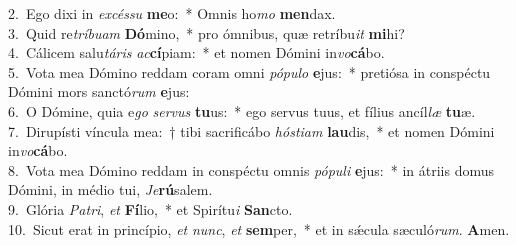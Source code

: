 {2.~}Ego dixi in \textit{ex}\textit{cés}\textit{su} \textbf{me}o:~* Omnis ho\textit{mo} \textbf{men}dax.\\
{3.~}Quid re\textit{trí}\textit{bu}\textit{am} \textbf{Dó}mino,~* pro ómnibus, quæ retríbu\textit{it} \textbf{mi}hi?\\
{4.~}Cálicem salu\textit{tá}\textit{ris} \textit{ac}\textbf{cí}piam:~* et nomen Dómini in\textit{vo}\textbf{cá}bo.\\
{5.~}Vota mea Dómino reddam coram omni \textit{pó}\textit{pu}\textit{lo} \textbf{e}jus:~* pretiósa in conspéctu Dómini mors sanctó\textit{rum} \textbf{e}jus:\\
{6.~}O Dómine, quia e\textit{go} \textit{ser}\textit{vus} \textbf{tu}us:~* ego servus tuus, et fílius ancíl\textit{læ} \textbf{tu}æ.\\
{7.~}Dirupísti víncula mea:~† tibi sacrificábo \textit{hó}\textit{sti}\textit{am} \textbf{lau}dis,~* et nomen Dómini in\textit{vo}\textbf{cá}bo.\\
{8.~}Vota mea Dómino reddam in conspéctu omnis \textit{pó}\textit{pu}\textit{li} \textbf{e}jus:~* in átriis domus Dómini, in médio tui, \textit{Je}\textbf{rú}salem.\\
{9.~}Glória \textit{Pa}\textit{tri}, \textit{et} \textbf{Fí}lio,~* et Spirítu\textit{i} \textbf{San}cto.\\
{10.~}Sicut erat in princípio, \textit{et} \textit{nunc}, \textit{et} \textbf{sem}per,~* et in sǽcula sæculó\textit{rum}. \textbf{A}men.\\

